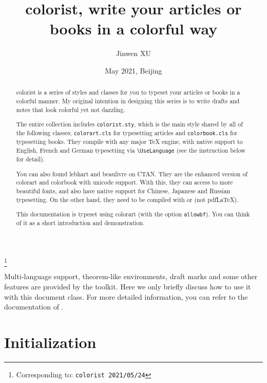 \documentclass[allowbf]{colorart}
\newenvironment{remind}[1][Remind]{%
    \begin{tcolorbox}[breakable,
        enhanced,
        width = \textwidth,
        colback = white, colbacktitle = paper,
        colframe = gray!50, boxrule=0.2mm,
        coltitle = black,
        fonttitle = \sffamily,
        attach boxed title to top left = {yshift=-\tcboxedtitleheight/2,  xshift=\tcboxedtitlewidth/4},
        boxed title style = {boxrule=0pt, colframe=paper},
        before skip = 0.3cm,
        after skip = 0.3cm,
        top = 3mm,
        bottom = 3mm,
        title={\sffamily #1}]%
}{\end{tcolorbox}}
\providecommand{\colorist}{{\normalfont\textsf{colorist}}}
\providecommand{\colorart}{{\normalfont\textsf{colorart}}}
\providecommand{\colorbook}{{\normalfont\textsf{colorbook}}}
\providecommand{\lebhart}{{\normalfont\textsf{lebhart}}}
\providecommand{\beaulivre}{{\normalfont\textsf{beaulivre}}}
\begin{document}
\title{{\normalfont\textbf{\textsf{colorist}}}, write your articles or books in a colorful way}
\author{Jinwen XU}
\thanks{Corresponding to: \texttt{\colorist{} 2021/05/24}}
\date{May 2021, Beijing}

\maketitle

\begin{abstract}
    \colorist{} is a series of styles and classes for you to typeset your articles or books in a colorful manner. My original intention in designing this series is to write drafts and notes that look colorful yet not dazzling.

    The entire collection includes \verb|colorist.sty|, which is the main style shared by all of the following classes; \verb|colorart.cls| for typesetting articles and \verb|colorbook.cls| for typesetting books. They compile with any major \TeX{} engine, with native support to English, French and German typesetting via \lstinline|\UseLanguage| (see the instruction below for detail).

    You can also found \lebhart{} and \beaulivre{} on CTAN. They are the enhanced version of \colorart{} and \colorbook{} with unicode support. With this, they can access to more beautiful fonts, and also have native support for Chinese, Japanese and Russian typesetting. On the other hand, they need to be compiled with  or  (not pdf\LaTeX).
    
    This documentation is typeset using \colorart{} (with the option \texttt{allowbf}). You can think of it as a short introduction and demonstration.
\end{abstract}

\tableofcontents

\bigskip\bigskip
\begin{remind}
    Multi-language support, theorem-like environments, draft marks and some other features are provided by the \ProjLib{} toolkit. Here we only briefly discuss how to use it with this document class. For more detailed information, you can refer to the documentation of \ProjLib{}.
\end{remind}

\clearpage
\section{Initialization}
\end{document}
